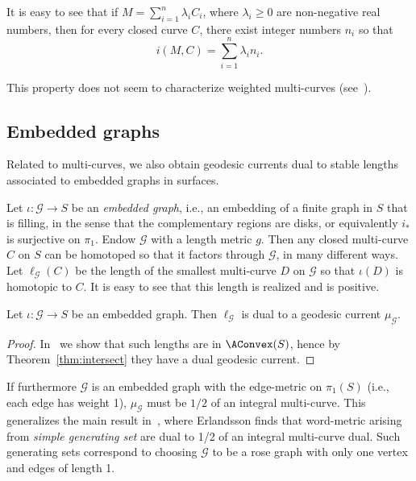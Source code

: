 
It is easy to see that if $M = \sum_{i=1}^n \lambda_i C_i$, where $\lambda_i \geq 0$ are non-negative real numbers, then for every closed curve $C$, there exist integer numbers $n_i$ so that
\begin{equation}
i(M, C) = \sum_{i=1}^n \lambda_i n_i.
\label{eq:weighted_multicurve}
\end{equation}

This property does not seem to characterize weighted multi-curves (see~\cite{Agol25:Spectrum}).

\subsection{Embedded graphs}
\label{subsec:embedded_graphs}
Related to multi-curves, we also obtain geodesic currents dual to stable lengths associated to embedded graphs in surfaces.

 Let $\iota \colon \mathcal{G} \to S$ be an \emph{embedded graph}, i.e., an embedding of a finite graph in $S$ that is filling, in the sense that the complementary regions are disks, or equivalently $i_*$ is surjective on $\pi_1$.
 Endow $\mathcal{G}$ with a length metric $g$. Then any closed multi-curve $C$ on $S$ can be homotoped so that it factors through $\mathcal{G}$, in many different ways. Let $\ell_{\mathcal{G}}(C)$ be the length of the smallest
 multi-curve $D$ on $\mathcal{G} $ so that $\iota(D)$ is homotopic to $C$. It is easy to see that this length is realized and is positive. 

\begin{theorem}
Let $\iota \colon \mathcal{G} \to S$ be an embedded graph. Then $\ell_{\mathcal{G}}$ is dual to a geodesic current $\mu_{\mathcal{G} }$.
\label{thm:dual_embeddedgraph}
\end{theorem}
\begin{proof}
In~\cite[4.4]{MGT21:Smoothings} we show that such lengths are in $\AConvex(S)$, hence by Theorem~\ref{thm:intersect} they have a dual geodesic current. 
\end{proof}

If furthermore $\mathcal{G}$ is an embedded graph with the edge-metric on $\pi_1(S)$ (i.e., each edge has weight 1), $\mu_{\mathcal{G}}$ must be $1/2$ of an integral multi-curve. This generalizes the main result in~\cite{Erlandsson:WordLength}, where Erlandsson finds that word-metric arising from \emph{simple generating set} are dual to 1/2 of an integral multi-curve dual. Such generating sets correspond to choosing $\mathcal{G}$ to be a rose graph with only one vertex and edges of length 1.

